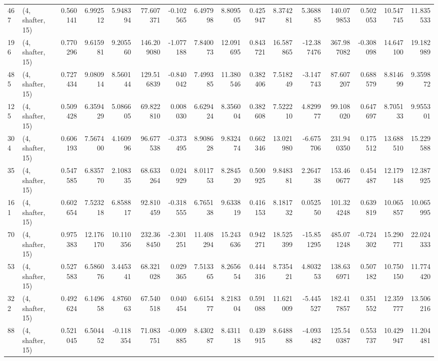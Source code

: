 \begin{tabular}{llrrrrrrrrrrrrrr}
467 &  (4, shafter, 15) &   0.560141 &   6.992512 &   5.948394 &    77.607371 &  -0.102565 &   6.497998 &   8.809505 &  0.425947 &   8.374281 &   5.368885 &   140.079853 &   0.502053 &  10.547745 &  11.835533 \\
196 &  (4, shafter, 15) &   0.770296 &   9.615981 &   9.205560 &   146.209080 &  -1.077188 &   7.840073 &  12.091695 &  0.843721 &  16.587865 & -12.387476 &   367.987082 &  -0.308098 &  14.647100 &  19.182989 \\
485 &  (4, shafter, 15) &   0.727434 &   9.080914 &   8.560144 &   129.516839 &  -0.840042 &   7.499385 &  11.380546 &  0.382406 &   7.518249 &  -3.147743 &    87.607207 &   0.688579 &   8.814699 &   9.359872 \\
125 &  (4, shafter, 15) &   0.509428 &   6.359429 &   5.086605 &    69.822810 &   0.008030 &   6.629424 &   8.356004 &  0.382608 &   7.522210 &   4.829977 &    99.108020 &   0.647697 &   8.705133 &   9.955301 \\
304 &  (4, shafter, 15) &   0.606193 &   7.567400 &   4.160996 &    96.677538 &  -0.373495 &   8.908628 &   9.832474 &  0.662346 &  13.021980 &  -6.675706 &   231.940350 &   0.175512 &  13.688510 &  15.229588 \\
35  &  (4, shafter, 15) &   0.547585 &   6.835770 &   2.108335 &    68.633264 &   0.024929 &   8.011753 &   8.284520 &  0.500925 &   9.848381 &   2.264738 &   153.460677 &   0.454487 &  12.179148 &  12.387925 \\
161 &  (4, shafter, 15) &   0.602654 &   7.523218 &   6.858817 &    92.810459 &  -0.318555 &   6.765138 &   9.633819 &  0.416153 &   8.181732 &   0.052550 &   101.324248 &   0.639819 &  10.065857 &  10.065995 \\
70  &  (4, shafter, 15) &   0.975383 &  12.176170 &  10.110356 &   232.368450 &  -2.301251 &  11.408294 &  15.243636 &  0.942271 &  18.525399 & -15.851295 &   485.071248 &  -0.724302 &  15.290771 &  22.024333 \\
53  &  (4, shafter, 15) &   0.527583 &   6.586076 &   3.445341 &    68.321028 &   0.029365 &   7.513365 &   8.265654 &  0.444316 &   8.735421 &   4.803253 &   138.636971 &   0.507182 &  10.750150 &  11.774420 \\
322 &  (4, shafter, 15) &   0.492624 &   6.149658 &   4.876063 &    67.540518 &   0.040454 &   6.615477 &   8.218304 &  0.591088 &  11.621009 &  -5.445527 &   182.417857 &   0.351552 &  12.359777 &  13.506216 \\
88  &  (4, shafter, 15) &   0.521045 &   6.504452 &  -0.118354 &    71.083751 &  -0.009885 &   8.430287 &   8.431118 &  0.439915 &   8.648888 &  -4.093482 &   125.540387 &   0.553737 &  10.429947 &  11.204481 \\

\end{tabular}
